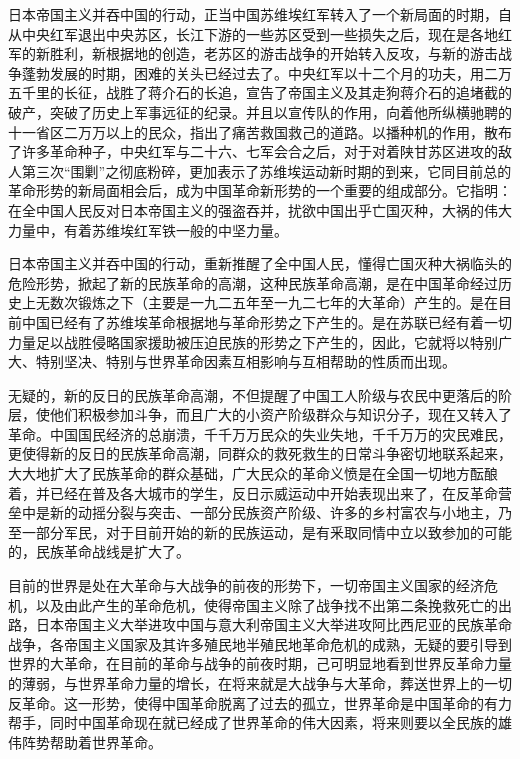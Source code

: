 日本帝国主义并吞中国的行动，正当中国苏维埃红军转入了一个新局面的时期，自从中央红军退出中央苏区，长江下游的一些苏区受到一些损失之后，现在是各地红军的新胜利，新根据地的创造，老苏区的游击战争的开始转入反攻，与新的游击战争蓬勃发展的时期，困难的关头已经过去了。中央红军以十二个月的功夫，用二万五千里的长征，战胜了蒋介石的长追，宣告了帝国主义及其走狗蒋介石的追堵截的破产，突破了历史上军事远征的纪录。并且以宣传队的作用，向着他所纵横驰聘的十一省区二万万以上的民众，指出了痛苦救国救己的道路。以播种机的作用，散布了许多革命种子，中央红军与二十六、七军会合之后，对于对着陕甘苏区进攻的敌人第三次“围剿”之彻底粉碎，更加表示了苏维埃运动新时期的到来，它同目前总的革命形势的新局面相会后，成为中国革命新形势的一个重要的组成部分。它指明：在全中国人民反对日本帝国主义的强盗吞并，扰欲中国出乎亡国灭种，大祸的伟大力量中，有着苏维埃红军铁一般的中坚力量。

日本帝国主义并吞中国的行动，重新推醒了全中国人民，懂得亡国灭种大祸临头的危险形势，掀起了新的民族革命的高潮，这种民族革命高潮，是在中国革命经过历史上无数次锻炼之下（主要是一九二五年至一九二七年的大革命）产生的。是在目前中国已经有了苏维埃革命根据地与革命形势之下产生的。是在苏联已经有着一切力量足以战胜侵略国家援助被压迫民族的形势之下产生的，因此，它就将以特别广大、特别坚决、特别与世界革命因素互相影响与互相帮助的性质而出现。

无疑的，新的反日的民族革命高潮，不但提醒了中国工人阶级与农民中更落后的阶层，使他们积极参加斗争，而且广大的小资产阶级群众与知识分子，现在又转入了革命。中国国民经济的总崩溃，千千万万民众的失业失地，千千万万的灾民难民，更使得新的反日的民族革命高潮，同群众的救死救生的日常斗争密切地联系起来，大大地扩大了民族革命的群众基础，广大民众的革命义愤是在全国一切地方酝酿着，并已经在普及各大城市的学生，反日示威运动中开始表现出来了，在反革命营垒中是新的动摇分裂与突击、一部分民族资产阶级、许多的乡村富农与小地主，乃至一部分军民，对于目前开始的新的民族运动，是有釆取同情中立以致参加的可能的，民族革命战线是扩大了。

目前的世界是处在大革命与大战争的前夜的形势下，一切帝国主义国家的经济危机，以及由此产生的革命危机，使得帝国主义除了战争找不出第二条挽救死亡的出路，日本帝国主义大举进攻中国与意大利帝国主义大举进攻阿比西尼亚的民族革命战争，各帝国主义国家及其许多殖民地半殖民地革命危机的成熟，无疑的要引导到世界的大革命，在目前的革命与战争的前夜时期，己可明显地看到世界反革命力量的薄弱，与世界革命力量的增长，在将来就是大战争与大革命，葬送世界上的一切反革命。这一形势，使得中国革命脱离了过去的孤立，世界革命是中国革命的有力帮手，同时中国革命现在就已经成了世界革命的伟大因素，将来则要以全民族的雄伟阵势帮助着世界革命。

